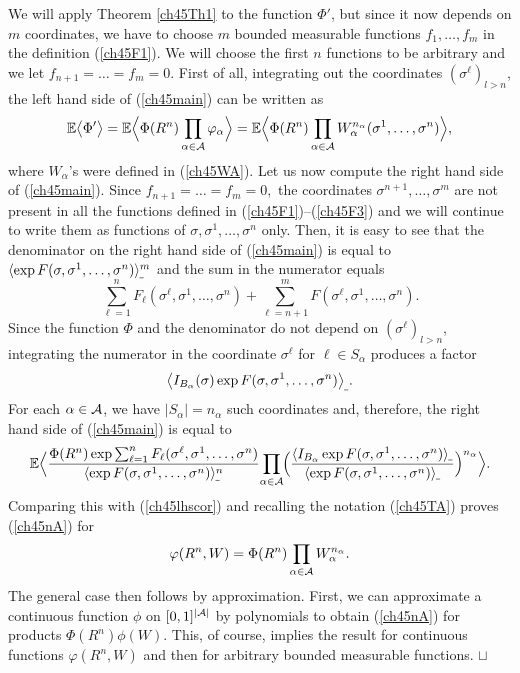 \documentclass[12pt]{article}
\newcommand{\A}{{\cal A}}
\newcommand{\e}{\mathbb{E}}
\newcommand{\la}{\langle}
\newcommand{\ra}{\rangle}
\newcommand\qed{\hfill\hbox{\rlap{$\sqcap$}$\sqcup$}}
\theoremstyle{nonumberplain}
\begin{document}
We will apply Theorem \ref{ch45Th1} to the function $\Phi'$, but since it now depends on $m$ coordinates,  we have to choose $m$ bounded measurable functions $f_1,\ldots, f_m$ in the definition (\ref{ch45F1}). We will choose the first $n$ functions to be arbitrary and we let $f_{n+1}=\ldots=f_m=0.$ First of all, integrating out the coordinates $(\sigma^{\ell})_{l>n}$, the left hand side of (\ref{ch45main}) can be written  as
\begin{equation}
\e \bigl\la \Phi'  \bigr\ra 
=
\e \Bigl\la \Phi(R^n) \prod_{\alpha\in\A} \varphi_\alpha \Bigr\ra
=
\e \Bigl\la\Phi(R^n) \prod_{\alpha\in\A} W_\alpha^{n_\alpha}(\sigma^1,\ldots,\sigma^n) \Bigr\ra,
\label{ch45lhscor}
\end{equation}
where $W_\alpha$'s were defined in (\ref{ch45WA}). Let us now compute the right hand side of (\ref{ch45main}). Since $f_{n+1}=\ldots=f_m=0,$ the coordinates $\sigma^{n+1},\ldots,\sigma^{m}$ are not present in all the functions defined in (\ref{ch45F1})--(\ref{ch45F3}) and we will continue to write them as functions of $\sigma,\sigma^1,\ldots,\sigma^n$ only. Then, it is easy to see that the denominator on the right hand side of (\ref{ch45main}) is equal to $\la\exp F(\sigma,\sigma^1,\ldots,\sigma^n)\ra_{\hspace{-0.3mm}\mathunderscore}^m$ and the sum in the numerator equals
$$
\sum_{\ell=1}^{n} F_{\ell}(\sigma^{\ell},\sigma^1,\ldots,\sigma^n)
+
\sum_{\ell=n+1}^{m} F(\sigma^{\ell},\sigma^1,\ldots,\sigma^n).  
$$
Since the function $\Phi$ and the denominator do not depend on  $(\sigma^{\ell})_{l>n}$, integrating the numerator in the coordinate $\sigma^{\ell}$ for $\ell\in S_\alpha$ produces a factor 
$$
\bigl\la I_{B_\alpha}(\sigma) \exp F(\sigma,\sigma^1,\ldots,\sigma^n )  \bigr\ra_{\hspace{-0.3mm}\mathunderscore}.
$$
For each $\alpha\in \A$, we have $|S_\alpha| = n_\alpha$ such coordinates and, therefore, the right hand side of (\ref{ch45main}) 
is equal to
$$
\e\Bigl\la
\frac{\Phi(R^n) \exp \sum_{\ell=1}^{n} F_{\ell}(\sigma^{\ell},\sigma^1,\ldots,\sigma^n)}
{\la\exp F(\sigma,\sigma^1,\ldots,\sigma^n)\ra_{\hspace{-0.3mm}\mathunderscore}^n}
\! \prod_{\alpha\in\A} \hspace{-0.3mm} \Bigl(\hspace{-0.1mm}
\frac{\la I_{B_\alpha} \exp F(\sigma,\sigma^1,\ldots,\sigma^n )\ra_{\hspace{-0.3mm}\mathunderscore}}
{\la \exp F(\sigma,\sigma^1,\ldots,\sigma^n )\ra_{\hspace{-0.3mm}\mathunderscore}}
\Bigr)^{n_\alpha}\Bigr\ra.
$$
Comparing this with (\ref{ch45lhscor}) and recalling the notation (\ref{ch45TA}) proves (\ref{ch45nA}) for
$$
\varphi(R^n, W) =\Phi(R^n) \prod_{\alpha\in \A} W_\alpha^{n_\alpha}.
$$
The general case then follows by approximation. First, we can approximate a continuous function $\phi$ on $[0,1]^{|\A|}$ by polynomials to obtain (\ref{ch45nA}) for products $\Phi(R^n) \phi(W)$. This, of course, implies the result for continuous functions $\varphi(R^n,W)$ and then for arbitrary bounded measurable functions.
\qed
\end{document}

